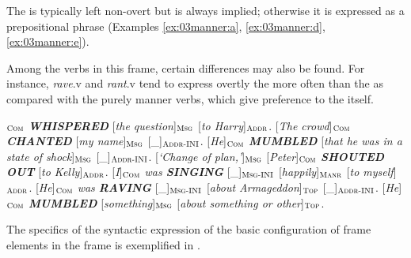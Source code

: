 \documentclass[output=paper,colorlinks,citecolor=brown]{langscibook}
\begin{document}
The  is typically left non-overt but is always implied; otherwise it is expressed as a prepositional phrase (Examples \ref{ex:03manner:a}, \ref{ex:03manner:d}, \ref{ex:03manner:e}).

Among the verbs in this frame, certain differences may also be found. For instance, \textit{rave}.v and \textit{rant}.v tend to express overtly the  more often than the  as compared with the purely manner verbs, which give preference to the  itself.


\begin{exe}
\ex \label{ex:03manner}
\begin{xlist}
\ex  \label{ex:03manner:a}
$_{\text{\textsc{Com}}}$ \textit{\textbf{WHISPERED}} [\textit{the question}]$_{\text{\textsc{Msg}}}$   {[\textit{to Harry}]}$_{\text{\textsc{Addr}}}$. 
\ex  \label{ex:03manner:b}
{[\textit{The crowd}]}$_{\text{\textsc{Com}}}$ \textit{\textbf{CHANTED}} [\textit{my name}]$_{\text{\textsc{Msg}}}$ {[\_]}$_{\text{\textsc{Addr-INI}}}$.
\ex  \label{ex:03manner:c}
{[\textit{He}]}$_{\text{\textsc{Com}}}$ \textit{\textbf{MUMBLED}} [\textit{that he was in a state of shock}]$_{\text{\textsc{Msg}}}$   {[\_]}$_{\text{\textsc{Addr-INI}}}$.
\ex  \label{ex:03manner:d}
{[\textit{`Change of plan,'}]}$_{\text{\textsc{Msg}}}$ [\textit{Peter}]$_{\text{\textsc{Com}}}$ \textit{\textbf{SHOUTED OUT}} {[\textit{to Kelly}]}$_{\text{\textsc{Addr}}}$.
\ex  \label{ex:03manner:e}
{[\textit{I}]}$_{\text{\textsc{Com}}}$ \textit{was \textbf{SINGING}}  [\_]$_{\text{\textsc{Msg-INI}}}$ [\textit{happily}]$_{\text{\textsc{Manr}}}$  
{[\textit{to myself}]}$_{\text{\textsc{Addr}}}$.
\ex  \label{ex:03manner:f}
{[\textit{He}]}$_{\text{\textsc{Com}}}$ \textit{was \textbf{RAVING}}  [\_]$_{\text{\textsc{Msg-INI}}}$  
{[\textit{about Armageddon}]}$_{\text{\textsc{Top}}}$ {[\_]}$_{\text{\textsc{Addr-INI}}}$.
\ex  \label{ex:03manner:g}
{[\textit{He}]}$_{\text{\textsc{Com}}}$ \textit{\textbf{MUMBLED}} [\textit{something}]$_{\text{\textsc{Msg}}}$  
{[\textit{about something or other}]}$_{\text{\textsc{Top}}}$.
\end{xlist}
\end{exe}

The specifics of the syntactic expression of the basic configuration of frame elements in the  frame is exemplified in .
\end{document}
